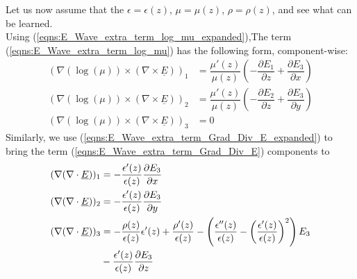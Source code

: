 \documentclass[12pt,twoside]{article}
\begin{document}
Let us now assume that the $\epsilon = \epsilon(z)$, $\mu=\mu(z)$, $\rho = \rho(z)$, and see what can be learned.\\
Using (\ref{eqns:E_Wave_extra_term_log_mu_expanded}),The term (\ref{eqns:E_Wave_extra_term_log_mu}) has the following form, component-wise:
\begin{subequations}
\begin{align}
\left(\nabla \left( \log (\mu) \right) \times \left(\nabla \times \underline{E} \right)\right)_1 &= \dfrac{\mu'(z)}{\mu(z)}\left( -\dfrac{\partial E_1}{\partial z} + \dfrac{\partial E_3}{\partial x}\right) \label{eqns:LogTerm_z_only_Eq1}\\
\left(\nabla \left( \log (\mu) \right) \times \left(\nabla \times \underline{E} \right)\right)_2 &= \dfrac{\mu'(z)}{\mu(z)}\left( -\dfrac{\partial E_2}{\partial z} + \dfrac{\partial E_3}{\partial y}\right) \label{eqns:LogTerm_z_only_Eq2} \\
\left(\nabla \left( \log (\mu) \right) \times \left(\nabla \times \underline{E} \right)\right)_3 &= 0 \label{eqns:LogTerm_z_only_Eq3}
\end{align}
\end{subequations}
Similarly, we use (\ref{eqns:E_Wave_extra_term_Grad_Div_E_expanded}) to bring the term (\ref{eqns:E_Wave_extra_term_Grad_Div_E}) components to
\begin{subequations}
\begin{align}
(\nabla (\nabla \cdot \underline{E}))_1 &= -\dfrac{\epsilon'(z)}{\epsilon(z)} \dfrac{\partial E_3}{\partial x}	\label{eqns:GradDivTerm_z_only_Eq1}\\
(\nabla (\nabla \cdot \underline{E}))_2 &= -\dfrac{\epsilon'(z)}{\epsilon(z)} \dfrac{\partial E_3}{\partial y} \label{eqns:GradDivTerm_z_only_Eq2}\\
(\nabla (\nabla \cdot \underline{E}))_3 &= -\dfrac{\rho(z)}{\epsilon(z)}\epsilon'(z) + \dfrac{\rho'(z)}{\epsilon(z)}-\left( \dfrac{\epsilon''(z)}{\epsilon(z)}-\left( \dfrac{\epsilon'(z)}{\epsilon(z)}\right)^2 \right)E_3 \label{eqns:GradDivTerm_z_only_Eq3}\\
& -\dfrac{\epsilon'(z)}{\epsilon(z)}\dfrac{\partial E_3}{\partial z}	\notag
\end{align}
\end{subequations}
\end{document}
